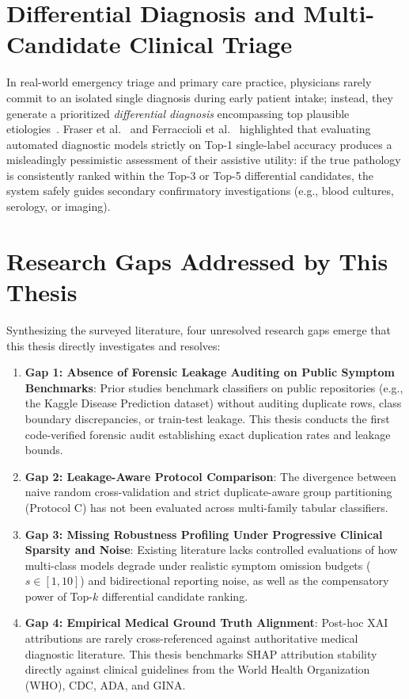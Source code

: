 \section{Differential Diagnosis and Multi-Candidate Clinical Triage}
\label{sec:differential_diagnosis_lit}

In real-world emergency triage and primary care practice, physicians rarely commit to an isolated single diagnosis during early patient intake; instead, they generate a prioritized \emph{differential diagnosis} encompassing top plausible etiologies~\cite{razzaki2018comparative}. Fraser et al.~\cite{fraser2018evaluating} and Ferraccioli et al.~\cite{ferraccioli2022differential} highlighted that evaluating automated diagnostic models strictly on Top-1 single-label accuracy produces a misleadingly pessimistic assessment of their assistive utility: if the true pathology is consistently ranked within the Top-3 or Top-5 differential candidates, the system safely guides secondary confirmatory investigations (e.g., blood cultures, serology, or imaging).

\section{Research Gaps Addressed by This Thesis}
\label{sec:research_gaps}

Synthesizing the surveyed literature, four unresolved research gaps emerge that this thesis directly investigates and resolves:

\begin{enumerate}
    \item \textbf{Gap 1: Absence of Forensic Leakage Auditing on Public Symptom Benchmarks}: Prior studies benchmark classifiers on public repositories (e.g., the Kaggle Disease Prediction dataset) without auditing duplicate rows, class boundary discrepancies, or train-test leakage. This thesis conducts the first code-verified forensic audit establishing exact duplication rates and leakage bounds.
    \item \textbf{Gap 2: Leakage-Aware Protocol Comparison}: The divergence between naive random cross-validation and strict duplicate-aware group partitioning (Protocol C) has not been evaluated across multi-family tabular classifiers.
    \item \textbf{Gap 3: Missing Robustness Profiling Under Progressive Clinical Sparsity and Noise}: Existing literature lacks controlled evaluations of how multi-class models degrade under realistic symptom omission budgets ($s \in [1, 10]$) and bidirectional reporting noise, as well as the compensatory power of Top-$k$ differential candidate ranking.
    \item \textbf{Gap 4: Empirical Medical Ground Truth Alignment}: Post-hoc XAI attributions are rarely cross-referenced against authoritative medical diagnostic literature. This thesis benchmarks SHAP attribution stability directly against clinical guidelines from the World Health Organization (WHO), CDC, ADA, and GINA.
\end{enumerate}
